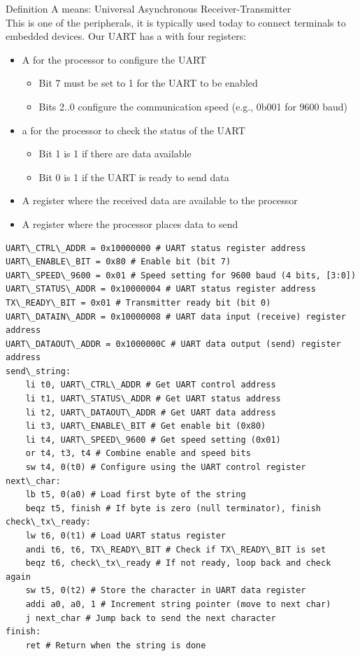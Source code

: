 \begin{parag}{Definition}
    A  means: Universal Asynchronous Receiver-Transmitter\\
	This is one of the  peripherals, it is typically used today to connect terminals to embedded devices. Our UART has a  with four registers:
	\begin{itemize}
	    \item A  for the processor to configure the UART 
			\begin{itemize}
				\item Bit 7 must be set to 1 for the UART to be enabled
				\item Bits 2..0 configure the communication speed (e.g., 0b001 for 9600 baud)
			\end{itemize}
		\item a  for the processor to check the status of the UART
			\begin{itemize}
				\item Bit 1 is 1 if there are data available
				\item Bit 0 is 1 if the UART is ready to send data
			\end{itemize}
			\item A  register where the received  data are available to the processor
			\item A  register where the processor places data to send
	\end{itemize}
\end{parag}
\begin{lstlisting}[language={[RISC-V]Assembler}]
UART\_CTRL\_ADDR = 0x10000000 # UART status register address
UART\_ENABLE\_BIT = 0x80 # Enable bit (bit 7)
UART\_SPEED\_9600 = 0x01 # Speed setting for 9600 baud (4 bits, [3:0])
UART\_STATUS\_ADDR = 0x10000004 # UART status register address
TX\_READY\_BIT = 0x01 # Transmitter ready bit (bit 0)
UART\_DATAIN\_ADDR = 0x10000008 # UART data input (receive) register address
UART\_DATAOUT\_ADDR = 0x1000000C # UART data output (send) register address
send\_string:
	li t0, UART\_CTRL\_ADDR # Get UART control address
	li t1, UART\_STATUS\_ADDR # Get UART status address
	li t2, UART\_DATAOUT\_ADDR # Get UART data address
	li t3, UART\_ENABLE\_BIT # Get enable bit (0x80)
	li t4, UART\_SPEED\_9600 # Get speed setting (0x01)
	or t4, t3, t4 # Combine enable and speed bits
	sw t4, 0(t0) # Configure using the UART control register
next\_char:
	lb t5, 0(a0) # Load first byte of the string
	beqz t5, finish # If byte is zero (null terminator), finish
check\_tx\_ready:
	lw t6, 0(t1) # Load UART status register
	andi t6, t6, TX\_READY\_BIT # Check if TX\_READY\_BIT is set
	beqz t6, check\_tx\_ready # If not ready, loop back and check again
	sw t5, 0(t2) # Store the character in UART data register
	addi a0, a0, 1 # Increment string pointer (move to next char)
	j next_char # Jump back to send the next character
finish:
	ret # Return when the string is done
\end{lstlisting}
	
